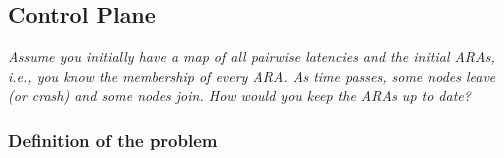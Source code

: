 \subsection{Control Plane} \label{Control_Plane_subsection}

\textit{Assume you initially have a map of all pairwise latencies and the initial ARAs, i.e., you know the membership of every ARA. As time passes, some nodes leave (or crash) and some nodes join. How would you keep the ARAs up to date?}

\subsubsection{Definition of the problem}

